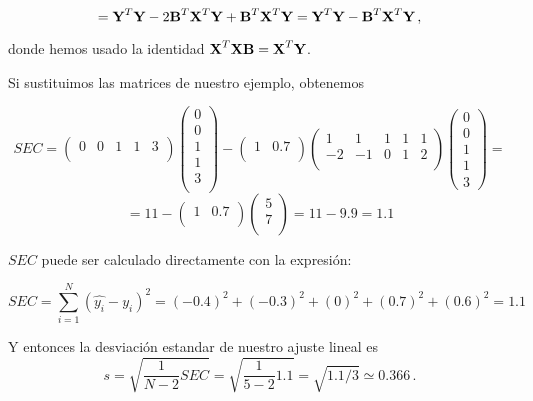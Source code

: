 \documentclass[
]{agujournal2019}
\begin{document}
\[={\textbf Y}^T{\textbf Y}-2{\textbf B}^T{\textbf X}^T{\textbf Y}+{\textbf B}^T{\textbf X}^T{\textbf Y}=
{\textbf Y}^T{\textbf Y}-{\textbf B}^T{\textbf X}^T{\textbf Y}\,,\]

donde hemos usado la identidad
\({\textbf X}^T{\textbf X}{\textbf B}={\textbf X}^T{\textbf Y}\).

Si sustituimos las matrices de nuestro ejemplo, obtenemos

\[SEC=\left(\begin{array}{ccccc}
  0 & 0 & 1 & 1 & 3\\
        \end{array}\right)
      \left(\begin{array}{c}
  0 \\ 0 \\ 1 \\ 1 \\ 3\\
        \end{array}\right)-
    \left(\begin{array}{ccccc}
  1 & 0.7\\
        \end{array}\right)
    \left(\begin{array}{ccccc}
   1 &  1 & 1 & 1 & 1\\
  -2 & -1 & 0 & 1 & 2 \\
        \end{array}\right)
    \left(\begin{array}{c}
  0 \\ 0 \\ 1 \\ 1 \\ 3
        \end{array}\right)=\] \[=11-\left(\begin{array}{ccccc}
  1 & 0.7\\
        \end{array}\right)
    \left(\begin{array}{c}
        5 \\ 7\\
        \end{array}\right)=11-9.9=1.1\]

\(SEC\) puede ser calculado directamente con la expresión:

\[SEC=\sum \limits^N_{i=1}(\hat{y_i}-y_i)^2=
   (-0.4)^2 + (-0.3)^2+(0)^2 + (0.7)^2 + (0.6)^2=1.1\]

\noindent Y entonces la desviación estandar de nuestro ajuste lineal es
\[s=\sqrt{\frac{1}{N-2}SEC}=\sqrt{\frac{1}{5-2}1.1}=\sqrt{1.1/3}\simeq0.366\,.\]
\end{document}
